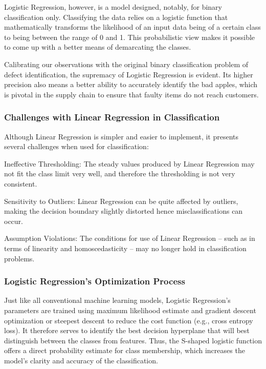 \documentclass[conference]{IEEEtran}
\begin{document}
Logistic Regression, however, is a model designed, notably, for binary classification only. Classifying the data relies on a logistic function that mathematically transforms the likelihood of an input data being of a certain class to being between the range of 0 and 1. This probabilistic view makes it possible to come up with a better means of demarcating the classes.

Calibrating our observations with the original binary classification problem of defect identification, the supremacy of Logistic Regression is evident. Its higher precision also means a better ability to accurately identify the bad apples, which is pivotal in the supply chain to ensure that faulty items do not reach customers.

\subsubsection{Challenges with Linear Regression in Classification}

Although Linear Regression is simpler and easier to implement, it presents several challenges when used for classification:

Ineffective Thresholding: The steady values produced by Linear Regression may not fit the class limit very well, and therefore the thresholding is not very consistent.

Sensitivity to Outliers: Linear Regression can be quite affected by outliers, making the decision boundary slightly distorted hence misclassifications can occur.

Assumption Violations: The conditions for use of Linear Regression – such as in terms of linearity and homoscedasticity – may no longer hold in classification problems.

\subsubsection{Logistic Regression's Optimization Process}

Just like all conventional machine learning models, Logistic Regression’s parameters are trained using maximum likelihood estimate and gradient descent optimization or steepest descent to reduce the cost function (e.g., cross entropy loss). It therefore serves to identify the best decision hyperplane that will best distinguish between the classes from features. Thus, the S-shaped logistic function offers a direct probability estimate for class membership, which increases the model’s clarity and accuracy of the classification.
\end{document}
